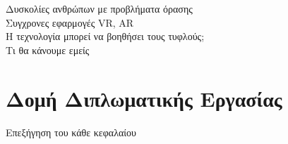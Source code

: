 
\setlength{\parindent}{24pt}
Δυσκολίες ανθρώπων με προβλήματα όρασης\\
Συγχρονες εφαρμογές VR, AR\\
Η τεχνολογία μπορεί να βοηθήσει τους τυφλούς;\\
Τι θα κάνουμε εμείς

\section{Δομή Διπλωματικής Εργασίας}
Επεξήγηση του κάθε κεφαλαίου